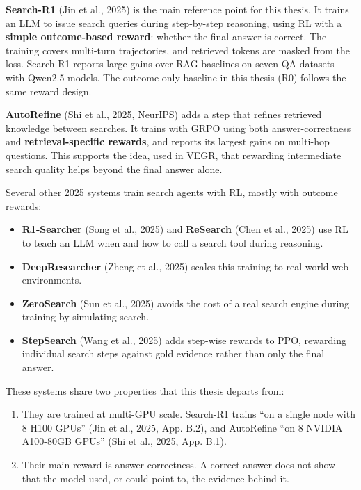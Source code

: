 \textbf{Search-R1} (Jin et al., 2025) is the main reference point for
this thesis. It trains an LLM to issue search queries during
step-by-step reasoning, using RL with a \textbf{simple outcome-based
reward}: whether the final answer is correct. The training covers
multi-turn trajectories, and retrieved tokens are masked from the loss.
Search-R1 reports large gains over RAG baselines on seven QA datasets
with Qwen2.5 models. The outcome-only baseline in this thesis (R0)
follows the same reward design.

\textbf{AutoRefine} (Shi et al., 2025, NeurIPS) adds a step that refines
retrieved knowledge between searches. It trains with GRPO using both
answer-correctness and \textbf{retrieval-specific rewards}, and reports
its largest gains on multi-hop questions. This supports the idea, used
in VEGR, that rewarding intermediate search quality helps beyond the
final answer alone.

Several other 2025 systems train search agents with RL, mostly with
outcome rewards:

\begin{itemize}
\tightlist
\item
  \textbf{R1-Searcher} (Song et al., 2025) and \textbf{ReSearch} (Chen
  et al., 2025) use RL to teach an LLM when and how to call a search
  tool during reasoning.
\item
  \textbf{DeepResearcher} (Zheng et al., 2025) scales this training to
  real-world web environments.
\item
  \textbf{ZeroSearch} (Sun et al., 2025) avoids the cost of a real
  search engine during training by simulating search.
\item
  \textbf{StepSearch} (Wang et al., 2025) adds step-wise rewards to PPO,
  rewarding individual search steps against gold evidence rather than
  only the final answer.
\end{itemize}

These systems share two properties that this thesis departs from:

\begin{enumerate}
\def\labelenumi{\arabic{enumi}.}
\tightlist
\item
  They are trained at multi-GPU scale. Search-R1 trains ``on a single
  node with 8 H100 GPUs'' (Jin et al., 2025, App. B.2), and AutoRefine
  ``on 8 NVIDIA A100-80GB GPUs'' (Shi et al., 2025, App. B.1).
\item
  Their main reward is answer correctness. A correct answer does not
  show that the model used, or could point to, the evidence behind it.
\end{enumerate}

